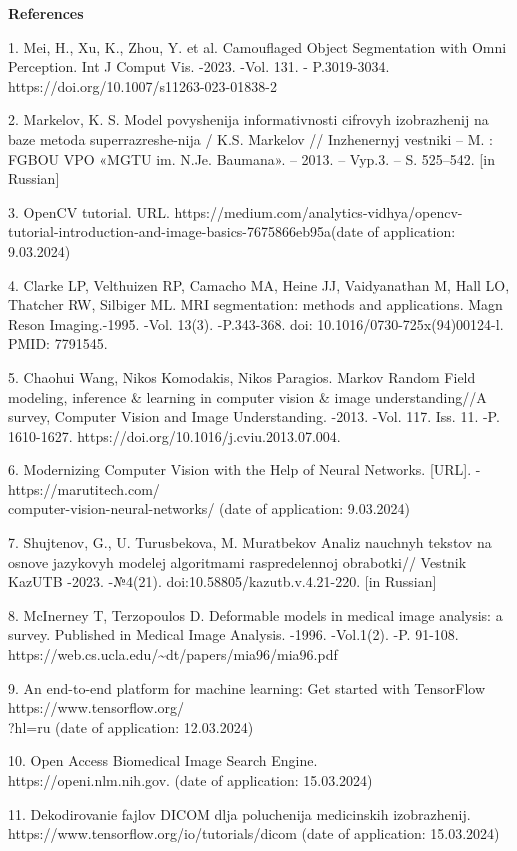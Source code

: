 \begin{center}
  {\bfseries References}
  \end{center}

\begin{noparindent}

1. Mei, H., Xu, K., Zhou, Y. et al. Camouflaged Object Segmentation with
Omni Perception. Int J Comput Vis. -2023. -Vol. 131. - P.3019-3034.
https://doi.org/10.1007/s11263-023-01838-2

2. Markelov, K. S. Model\textquotesingle{} povyshenija informativnosti
cifrovyh izobrazhenij na baze metoda superrazreshe-nija / K.S. Markelov
// Inzhenernyj vestniki -- M. : FGBOU VPO «MGTU im. N.Je. Baumana». --
2013. -- Vyp.3. -- S. 525--542. {[}in Russian{]}

3. OpenCV tutorial. URL.
https://medium.com/analytics-vidhya/opencv-tutorial-introduction-and-image-basics-7675866eb95a(date
of application: 9.03.2024)

4. Clarke LP, Velthuizen RP, Camacho MA, Heine JJ, Vaidyanathan M, Hall
LO, Thatcher RW, Silbiger ML. MRI segmentation: methods and
applications. Magn Reson Imaging.-1995. -Vol. 13(3). -P.343-368. doi:
10.1016/0730-725x(94)00124-l. PMID: 7791545.

5. Chaohui Wang, Nikos Komodakis, Nikos Paragios. Markov Random Field
modeling, inference \& learning in computer vision \& image
understanding//A survey, Computer Vision and Image Understanding. -2013.
-Vol. 117. Iss. 11. -P. 1610-1627.
https://doi.org/10.1016/j.cviu.2013.07.004.

6. Modernizing Computer Vision with the Help of Neural Networks.
{[}URL{]}. - https://marutitech.com/\\computer-vision-neural-networks/
(date of application: 9.03.2024)

7. Shujtenov, G., U. Turusbekova, M. Muratbekov Analiz nauchnyh tekstov
na osnove jazykovyh modelej algoritmami raspredelennoj obrabotki//
Vestnik KazUTB -2023. -№4(21). doi:10.58805/kazutb.v.4.21-220. {[}in
Russian{]}

8. McInerney T, Terzopoulos D. Deformable models in medical image
analysis: a survey. Published in Medical Image Analysis. -1996.
-Vol.1(2). -P. 91-108.
https://web.cs.ucla.edu/\textasciitilde dt/papers/mia96/mia96.pdf

9. An end-to-end platform for machine learning: Get started with
TensorFlow https://www.tensorflow.org/\\?hl=ru (date of application:
12.03.2024)

10. Open Access Biomedical Image Search Engine.
\\https://openi.nlm.nih.gov. (date of application: 15.03.2024)

11. Dekodirovanie fajlov DICOM dlja poluchenija medicinskih
izobrazhenij. \\https://www.tensorflow.org/io/tutorials/dicom (date of
application: 15.03.2024)
\end{noparindent}


